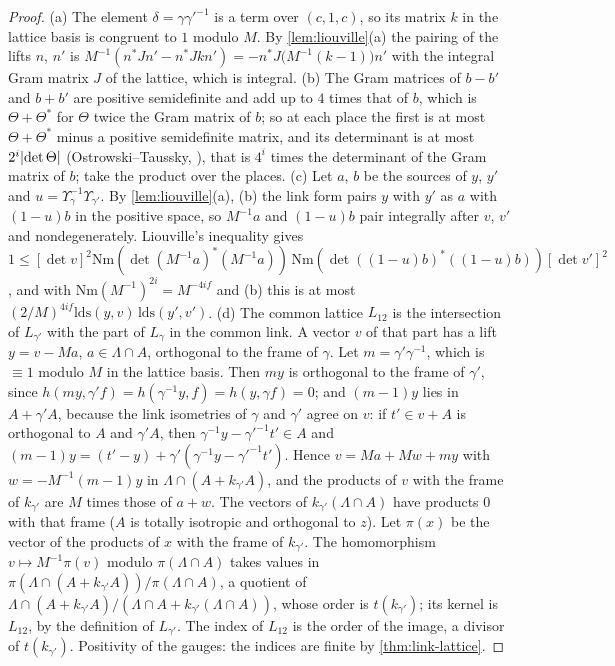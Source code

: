 \begin{proof}
(a) The element $\delta=\gamma\gamma'^{-1}$ is a term over $(c,1,c)$, so its matrix $k$ in the lattice basis is congruent to $1$ modulo $M$. By \cref{lem:liouville}(a) the pairing of the lifts $n$, $n'$ is
$M^{-1}(n^*Jn'-n^*Jkn')=-n^*J\bigl(M^{-1}(k-1)\bigr)n'$ with the integral Gram matrix $J$ of the lattice, which is integral. (b) The Gram matrices of $b-b'$ and $b+b'$ are positive semidefinite and add up to $4$ times that of
$b$, which is $\Theta+\Theta^*$ for $\Theta$ twice the Gram matrix of $b$; so at each place the first is at most $\Theta+\Theta^*$ minus a positive semidefinite matrix, and its determinant is at most $2^i\lvert \det\Theta\rvert$ (Ostrowski--Taussky,
\cite{OstrowskiTaussky1951}), that is $4^i$ times the determinant of the Gram matrix of $b$; take the product over the places. (c) Let $a$, $b$ be the sources of $y$, $y'$ and $u=\Upsilon_\gamma^{-1}\Upsilon_{\gamma'}$. By
\cref{lem:liouville}(a), (b) the link form pairs $y$ with $y'$ as $a$ with $(1-u)b$ in the positive space, so $M^{-1}a$ and $(1-u)b$ pair integrally after $v$, $v'$ and nondegenerately. Liouville's inequality gives
$1\le[\det v]^2\mathrm{Nm}(\det(M^{-1}a)^*(M^{-1}a))\,\mathrm{Nm}(\det((1-u)b)^*((1-u)b))[\det v']^2$, and with $\mathrm{Nm}(M^{-1})^{2i}=M^{-4if}$ and (b) this is at most $(2/M)^{4if}\mathrm{lds}(y,v)\,\mathrm{lds}(y',v')$.
(d) The common lattice $L_{12}$ is the intersection of $L_{\gamma'}$ with the part of $L_\gamma$ in the common link. A vector $v$ of that part has a lift $y=v-Ma$, $a\in\Lambda\cap A$, orthogonal to the frame of $\gamma$.
Let $m=\gamma'\gamma^{-1}$, which is $\equiv1$ modulo $M$ in the lattice basis. Then $my$ is orthogonal to the frame of $\gamma'$, since $h(my,\gamma'f)=h(\gamma^{-1}y,f)=h(y,\gamma f)=0$; and $(m-1)y$ lies in $A+\gamma'A$, because the
link isometries of $\gamma$ and $\gamma'$ agree on $v$: if $t'\in v+A$ is orthogonal to $A$ and $\gamma'A$, then $\gamma^{-1}y-\gamma'^{-1}t'\in A$ and $(m-1)y=(t'-y)+\gamma'(\gamma^{-1}y-\gamma'^{-1}t')$. Hence
$v=Ma+Mw+my$ with $w=-M^{-1}(m-1)y$ in $\Lambda\cap(A+k_{\gamma'}A)$, and the products of $v$ with the frame of $k_{\gamma'}$ are $M$ times those of $a+w$. The vectors of $k_{\gamma'}(\Lambda\cap A)$ have products $0$ with that
frame ($A$ is totally isotropic and orthogonal to $z$). Let $\pi(x)$ be the vector of the products of $x$ with the frame of $k_{\gamma'}$. The homomorphism $v\mapsto M^{-1}\pi(v)$ modulo $\pi(\Lambda\cap A)$ takes values in
$\pi(\Lambda\cap(A+k_{\gamma'}A))/\pi(\Lambda\cap A)$, a quotient of $\Lambda\cap(A+k_{\gamma'}A)/(\Lambda\cap A+k_{\gamma'}(\Lambda\cap A))$, whose order is $t(k_{\gamma'})$; its kernel is $L_{12}$, by the definition of $L_{\gamma'}$. The
index of $L_{12}$ is the order of the image, a divisor of $t(k_{\gamma'})$. Positivity of the gauges: the indices are finite by \cref{thm:link-lattice}.
\end{proof}

